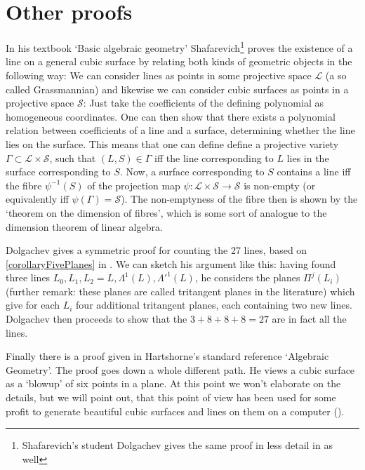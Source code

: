 \section{Other proofs}

In his textbook `Basic algebraic geometry' Shafarevich\footnote{Shafarevich's student Dolgachev gives the same proof in less detail in \cite[theorem 9.1.13]{dolgachev2012classical} as well} proves the existence of a line on a general cubic surface by relating both kinds of geometric objects in the following way:
We can consider lines as points in some projective space $\mathcal L$ (a so called Grassmannian) and likewise we can consider cubic surfaces as points in a projective space $\mathcal S$: Just take the coefficients of the defining polynomial as homogeneous coordinates.
One can then show that there exists a polynomial relation between coefficients of a line and a surface, determining whether the line lies on the surface.
This means that one can define define a projective variety $\Gamma \subset \mathcal L \times \mathcal S$, such that $(L,S) \in \Gamma$ iff the line corresponding to $L$ lies in the surface corresponding to $S$.
Now, a surface corresponding to $S$ contains a line iff the fibre $\psi^{-1}(S)$ of the projection map $\psi : \mathcal L \times \mathcal S \to \mathcal S$ is non-empty (or equivalently iff $\psi(\Gamma) = \mathcal S$).
The non-emptyness of the fibre then is shown by the `theorem on the dimension of fibres', which is some sort of analogue to the dimension theorem of linear algebra.

Dolgachev gives a symmetric proof for counting the 27 lines, based on \ref{corollaryFivePlanes} in \cite[theorem 9.1.13]{dolgachev2012classical}.
We can sketch his argument like this: having found three lines $L_0,L_1,L_2 = L,\Lambda^1(L),\Lambda'^1(L)$, he considers the planes $\Pi^j(L_i)$ (further remark: these planes are called tritangent planes in the literature) which give for each $L_i$ four additional tritangent planes, each containing two new lines.
Dolgachev then proceeds to show that the $3+8+8+8 = 27$ are in fact all the lines.

Finally there is a proof given in Hartshorne's standard reference `Algebraic Geometry'.
The proof \cite[theorem 4.9]{hartshorne1977algebraic} goes down a whole different path.
He views a cubic surface as a `blowup' of six points in a plane.
At this point we won't elaborate on the details, but we will point out, that this point of view has been used for some profit to generate beautiful cubic surfaces and lines on them on a computer (\cite{van2003visual}).
